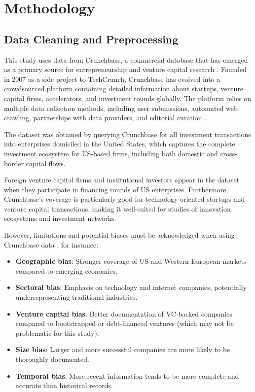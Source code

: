 \section{Methodology}

\subsection{Data Cleaning and Preprocessing}

This study uses data from Crunchbase, a commercial database that has emerged as a primary source for entrepreneurship and venture capital research \cite{OECD2017}. Founded in 2007 as a side project to TechCrunch, Crunchbase has evolved into a crowdsourced platform containing detailed information about startups, venture capital firms, accelerators, and investment rounds globally. The platform relies on multiple data collection methods, including user submissions, automated web crawling, partnerships with data providers, and editorial curation \cite{OECD2017}.

The dataset was obtained by querying Crunchbase for all investment transactions into enterprises domiciled in the United States, which captures the complete investment ecosystem for US-based firms, including both domestic and cross-border capital flows. 

Foreign venture capital firms and institutional investors appear in the dataset when they participate in financing rounds of US enterprises. Furthermore, Crunchbase's coverage is particularly good for technology-oriented startups and venture capital transactions, making it well-suited for studies of innovation ecosystems and investment networks.

However, limitations and potential biases must be acknowledged when using Crunchbase data \cite{OECD2017}, for instance:

\begin{itemize}
    \item \textbf{Geographic bias}: Stronger coverage of US and Western European markets compared to emerging economies.
    \item \textbf{Sectoral bias}: Emphasis on technology and internet companies, potentially underrepresenting traditional industries.
    \item \textbf{Venture capital bias}: Better documentation of VC-backed companies compared to bootstrapped or debt-financed ventures (which may not be problematic for this study).
    \item \textbf{Size bias}: Larger and more successful companies are more likely to be thoroughly documented.
    \item \textbf{Temporal bias}: More recent information tends to be more complete and accurate than historical records.
\end{itemize}

